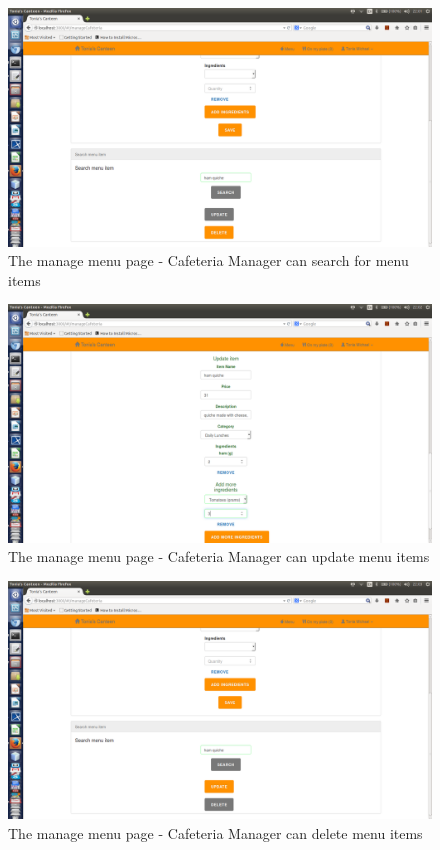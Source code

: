 \documentclass[a4paper,12pt]{report}
\begin{document}
\begin{figure}[H]
  \centering
    \includegraphics[width=1.0\textwidth]{screenshots/searchMenuItem.png}
    \caption{The manage menu page - Cafeteria Manager can search for menu items}
\end{figure}

\begin{figure}[H]
  \centering
    \includegraphics[width=1.0\textwidth]{screenshots/updateMenu.png}
    \caption{The manage menu page - Cafeteria Manager can update menu items}
\end{figure}

\begin{figure}[H]
  \centering
    \includegraphics[width=1.0\textwidth]{screenshots/deleteHam.png}
    \caption{The manage menu page - Cafeteria Manager can delete menu items}
\end{figure}
\end{document}
